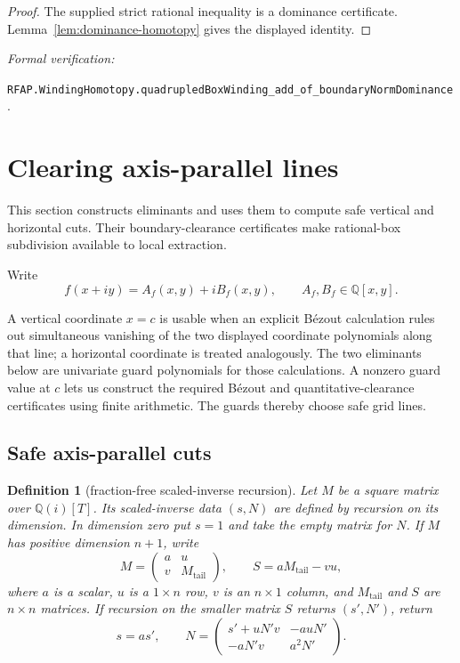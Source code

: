 \documentclass[11pt]{article}
\newtheorem{definition}[theorem]{Definition}
\newcommand{\Qi}{\mathbb{Q}(i)}
\newcommand{\Q}{\mathbb{Q}}
\newcommand{\leanref}[1]{\par\smallskip\noindent
  \emph{Formal verification:}\par\nobreak
  {\raggedright\nolinkurl{#1}.\par}}
\begin{document}
\begin{proof}
The supplied strict rational inequality is a dominance certificate.
Lemma~\ref{lem:dominance-homotopy} gives the displayed identity.
\end{proof}

\leanref{RFAP.WindingHomotopy.quadrupledBoxWinding_add_of_boundaryNormDominance}

\section{Clearing axis-parallel lines}

This section constructs eliminants and uses them to compute safe vertical and
horizontal cuts.  Their boundary-clearance certificates make rational-box
subdivision available to local extraction.

Write
\[
 f(x+iy)=A_f(x,y)+iB_f(x,y),\qquad A_f,B_f\in\Q[x,y].
\]

A vertical coordinate $x=c$ is usable when an explicit B\'ezout calculation
rules out simultaneous vanishing of the two displayed coordinate
polynomials along that line; a horizontal coordinate is treated analogously.
The two eliminants below are univariate guard polynomials for those
calculations.  A nonzero guard value at $c$ lets us construct the required
B\'ezout and quantitative-clearance certificates using finite arithmetic.
The guards thereby choose safe grid lines.

\subsection{Safe axis-parallel cuts}

\begin{definition}[fraction-free scaled-inverse recursion]
\label{def:fraction-free-scaled-inverse}
Let $M$ be a square matrix over $\Qi[T]$.  Its scaled-inverse data $(s,N)$
are defined by recursion on its dimension.  In dimension zero put $s=1$ and
take the empty matrix for $N$.  If $M$ has positive dimension $n+1$, write
\[
 M=\begin{pmatrix}a&u\\ v&M_{\mathrm{tail}}\end{pmatrix},
 \qquad S=aM_{\mathrm{tail}}-vu,
\]
where $a$ is a scalar, $u$ is a $1\times n$ row, $v$ is an $n\times1$
column, and $M_{\mathrm{tail}}$ and $S$ are $n\times n$ matrices.  If
recursion on the smaller matrix $S$ returns $(s',N')$, return
\[
 s=as',\qquad
 N=\begin{pmatrix}
      s'+uN'v&-auN'\\
      -aN'v&a^2N'
    \end{pmatrix}.
\]
\end{definition}
\end{document}
